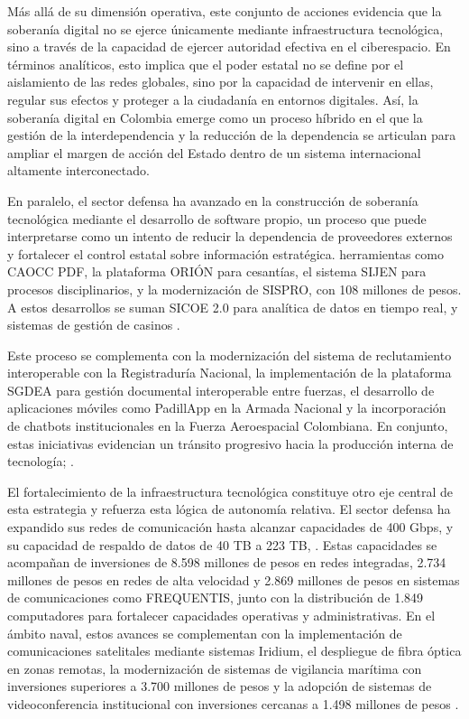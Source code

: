 Más allá de su dimensión operativa, este conjunto de acciones evidencia que la soberanía digital no se ejerce únicamente mediante infraestructura tecnológica, sino a través de la capacidad de ejercer autoridad efectiva en el ciberespacio. En términos analíticos, esto implica que el poder estatal no se define por el aislamiento de las redes globales, sino por la capacidad de intervenir en ellas, regular sus efectos y proteger a la ciudadanía en entornos digitales. Así, la soberanía digital en Colombia emerge como un proceso híbrido en el que la gestión de la interdependencia y la reducción de la dependencia se articulan para ampliar el margen de acción del Estado dentro de un sistema internacional altamente interconectado.

En paralelo, el sector defensa ha avanzado en la construcción de soberanía tecnológica mediante el desarrollo de software propio, un proceso que puede interpretarse como un intento de reducir la dependencia de proveedores externos y fortalecer el control estatal sobre información estratégica. herramientas como CAOCC PDF,  la plataforma ORIÓN para cesantías,  el sistema SIJEN para procesos disciplinarios,  y la modernización de SISPRO, con 108 millones de pesos. A estos desarrollos se suman SICOE 2.0 para analítica de datos en tiempo real,  y sistemas de gestión de casinos  \parencite{mindefensa_audiencia_rendicion_2025,cogfm_informe_ejecutivo_2025}.

Este proceso se complementa con la modernización del sistema de reclutamiento interoperable con la Registraduría Nacional, la implementación de la plataforma SGDEA para gestión documental interoperable entre fuerzas, el desarrollo de aplicaciones móviles como PadillApp en la Armada Nacional y la incorporación de chatbots institucionales en la Fuerza Aeroespacial Colombiana. En conjunto, estas iniciativas evidencian un tránsito progresivo hacia la producción interna de tecnología;  \parencite{arc_informe_rendicion_2023,fac_informe_rendicion_2023,cardoso_faletto_dependencia_1977}.

El fortalecimiento de la infraestructura tecnológica constituye otro eje central de esta estrategia y refuerza esta lógica de autonomía relativa. El sector defensa ha expandido sus redes de comunicación hasta alcanzar capacidades de 400 Gbps, y su capacidad de respaldo de datos de 40 TB a 223 TB, . Estas capacidades se acompañan de inversiones de 8.598 millones de pesos en redes integradas, 2.734 millones de pesos en redes de alta velocidad y 2.869 millones de pesos en sistemas de comunicaciones como FREQUENTIS, junto con la distribución de 1.849 computadores para fortalecer capacidades operativas y administrativas. En el ámbito naval, estos avances se complementan con la implementación de comunicaciones satelitales mediante sistemas Iridium, el despliegue de fibra óptica en zonas remotas, la modernización de sistemas de vigilancia marítima con inversiones superiores a 3.700 millones de pesos y la adopción de sistemas de videoconferencia institucional con inversiones cercanas a 1.498 millones de pesos \parencite{mindefensa_audiencia_rendicion_2025,arc_informe_rendicion_2023,cogfm_informe_ejecutivo_2025}.

